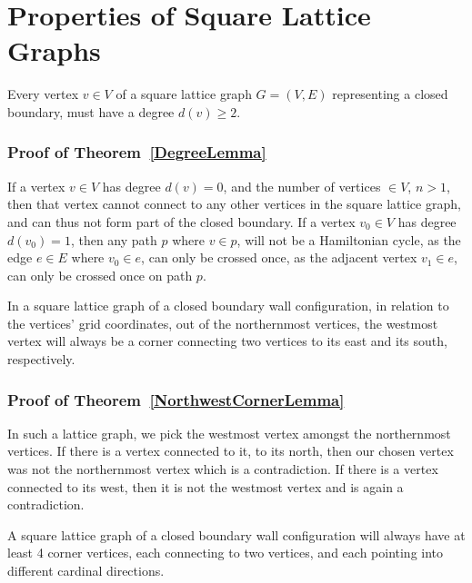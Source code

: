 \section{Properties of Square Lattice Graphs}
\begin{theorem}
Every vertex $v\in V$ of a square lattice graph $G=(V,E)$ representing a closed boundary, must have a degree $d(v)\geq 2$.\label{DegreeLemma}
\end{theorem}
\subsubsection*{Proof of Theorem~\ref{DegreeLemma}}
If a vertex $v\in V$ has degree $d(v)=0$, and the number of vertices $\in V$, $n>1$, then that vertex cannot connect to any other vertices in the square lattice graph, and can thus not form part of the closed boundary. If a vertex $v_0\in V$ has degree $d(v_0)=1$, then any path $p$ where $v\in p$, will not be a Hamiltonian cycle, as the edge $e\in E$ where $v_0\in e$, can only be crossed once, as the adjacent vertex $v_1\in e$, can only be crossed once on path $p$.
\begin{theorem}
In a square lattice graph of a closed boundary wall configuration, in relation to the vertices' grid coordinates, out of the northernmost vertices, the westmost vertex will always be a corner connecting two vertices to its east and its south, respectively.\label{NorthwestCornerLemma}
\end{theorem}
\subsubsection*{Proof of Theorem~\ref{NorthwestCornerLemma}}
In such a lattice graph, we pick the westmost vertex amongst the northernmost vertices. If there is a vertex connected to it, to its north, then our chosen vertex was not the northernmost vertex which is a contradiction. If there is a vertex connected to its west, then it is not the westmost vertex and is again a contradiction. 
\begin{theorem}
A square lattice graph of a closed boundary wall configuration will always have at least 4 corner vertices, each connecting to two vertices, and each pointing into different cardinal directions.\label{FourCornerLemma}
\end{theorem}
